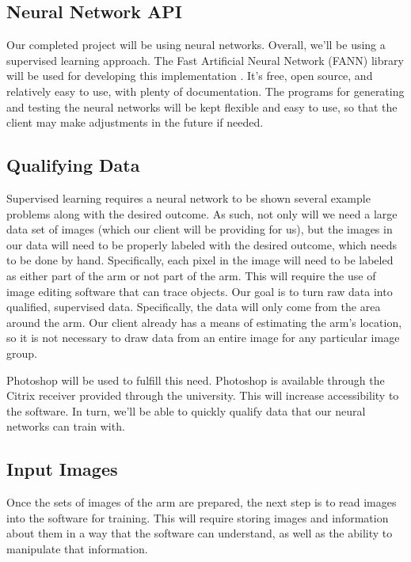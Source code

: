 \documentclass[10pt,journal,compsoc, draftclsnofoot,onecolumn]{IEEEtran}
\begin{document}
\subsection{Neural Network API}
Our completed project will be using neural networks. Overall, we'll be using a supervised learning approach.
The Fast Artificial Neural Network (FANN) library will be used for developing this implementation \cite{3:online}.
It's free, open source, and relatively easy to use, with plenty of documentation.
The programs for generating and testing the neural networks will be kept flexible and easy to use, so that the client may make adjustments in the future if needed.

\subsection{Qualifying Data}
Supervised learning requires a neural network to be shown several example problems along with the desired outcome.
As such, not only will we need a large data set of images (which our client will be providing for us), but the images in our data will need to be properly labeled with the desired outcome, which needs to be done by hand.
Specifically, each pixel in the image will need to be labeled as either part of the arm or not part of the arm.
This will require the use of image editing software that can trace objects.
Our goal is to turn raw data into qualified, supervised data.
Specifically, the data will only come from the area around the arm. Our client already has a means of estimating the arm's location, so it is not necessary to draw data from an entire image for any particular image group.

Photoshop will be used to fulfill this need.
Photoshop is available through the Citrix receiver provided through the university.
This will increase accessibility to the software. In turn, we'll be able to quickly qualify data that our neural networks can train with.

\subsection{Input Images}
Once the sets of images of the arm are prepared, the next step is to read images into the software for training.
This will require storing images and information about them in a way that the software can understand, as well as the ability to manipulate that information.
\end{document}
